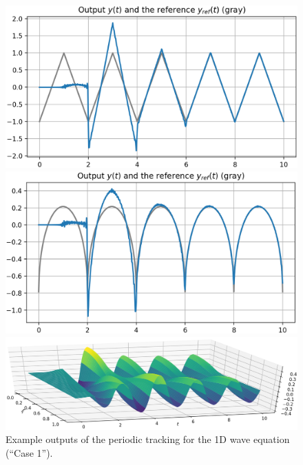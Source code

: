 \documentclass[11pt, a4paper]{amsart}
\theoremstyle{definition}
\numberwithin{equation}{section}
\begin{document}
\begin{figure}[h!]
  \centering
  \begin{minipage}{0.48\linewidth}
    \begin{flushleft}
      \includegraphics[width=\linewidth]{W1dout_triangle.png}
    \end{flushleft}
  \end{minipage}
  \begin{minipage}{0.48\linewidth}
    \begin{flushright}
      \includegraphics[width=\linewidth]{W1dout_semic.png}
    \end{flushright}
  \end{minipage}

  \vspace{3ex}

    \begin{center}
      \includegraphics[width=.95\linewidth]{W1dprofile_triangle.png}
    \end{center}
    \caption{Example outputs of the periodic tracking for the 1D wave equation (``Case 1'').}
  \label{fig:1Dwave1}
\end{figure}
\end{document}
